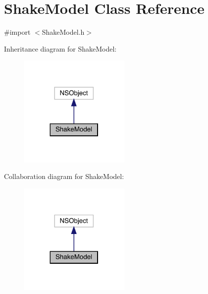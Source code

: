 \hypertarget{interface_shake_model}{}\section{Shake\+Model Class Reference}
\label{interface_shake_model}


{\ttfamily \#import $<$Shake\+Model.\+h$>$}



Inheritance diagram for Shake\+Model\+:\nopagebreak
\begin{figure}[H]
\begin{center}
\leavevmode
\includegraphics[width=152pt]{interface_shake_model__inherit__graph}
\end{center}
\end{figure}


Collaboration diagram for Shake\+Model\+:\nopagebreak
\begin{figure}[H]
\begin{center}
\leavevmode
\includegraphics[width=152pt]{interface_shake_model__coll__graph}
\end{center}
\end{figure}
